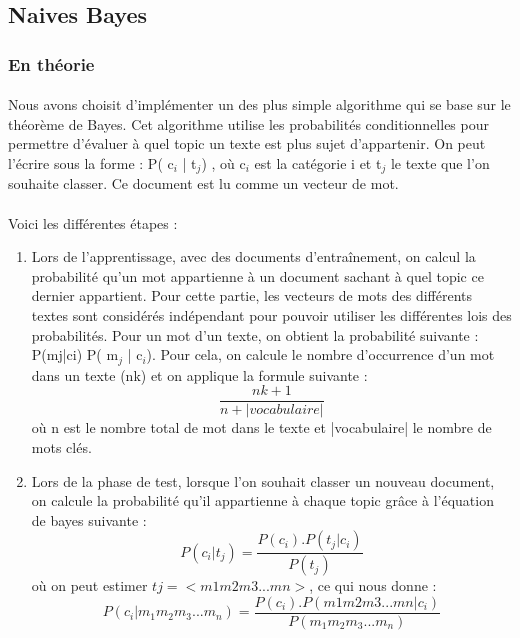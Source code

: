 \subsection{Naives Bayes}

\subsubsection{En théorie}
\paragraph{}
Nous avons choisit d'implémenter un des plus simple algorithme qui se base sur le théorème de Bayes. Cet algorithme utilise les probabilités conditionnelles pour permettre d'évaluer à quel topic un texte est plus sujet d'appartenir. On peut l'écrire sous la forme :  P( c$_{i}$ | t$_{j}$) , où c$_{i}$ est la catégorie i et  t$_{j}$ le texte que l'on souhaite classer. Ce document est lu comme un vecteur de mot. 

\paragraph{}
Voici les différentes étapes : 
\begin{enumerate}
\item Lors de l'apprentissage, avec des documents d’entraînement, on calcul la probabilité qu'un mot appartienne à un document sachant à quel topic ce dernier appartient. Pour cette partie, les vecteurs de mots des différents textes sont considérés indépendant pour pouvoir utiliser les différentes lois des probabilités.
Pour un mot d'un texte, on obtient la probabilité suivante : P(mj|ci) P( m$_{j}$ | c$_{i}$). Pour cela, on calcule le nombre d’occurrence d'un mot dans un texte (nk) et on applique la formule suivante :
\[\frac{ nk +1} {n+|vocabulaire|}\]
 où n est le nombre total de mot dans le texte et |vocabulaire| le nombre de mots clés.

\item Lors de la phase de test, lorsque l'on souhait classer un nouveau document, on calcule la probabilité qu'il appartienne à chaque topic grâce à l'équation de bayes suivante : 
\[ P( c_{i} | t_{j})= \frac{P(c_{i}).P(t_{j}|c_{i})}{ P(t_{j})}\] 
où on peut estimer $tj=<m1 m2 m3... mn>$, ce qui nous donne : 
\[ P( c_{i} | m_{1} m_{2} m_{3}... m_{n})= \frac{P(c_{i}).P(m1 m2 m3... mn|c_{i})}{ P( m_{1} m_{2} m_{3}... m_{n})}\]
\end{enumerate}
	

